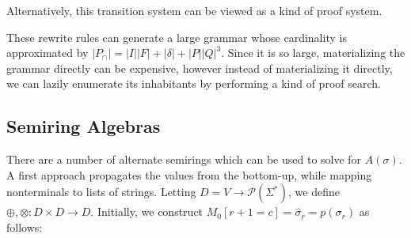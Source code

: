 \documentclass[runningheads]{llncs}
\begin{document}
\noindent Alternatively, this transition system can be viewed as a kind of proof system.


\noindent These rewrite rules can generate a large grammar whose cardinality is approximated by $|P_\cap|=|I||F| + |\delta| + |P||Q|^3$. Since it is so large, materializing the grammar directly can be expensive, however instead of materializing it directly, we can lazily enumerate its inhabitants by performing a kind of proof search.



\subsection{Semiring Algebras}

There are a number of alternate semirings which can be used to solve for $A(\sigma)$. A first approach propagates the values from the bottom-up, while mapping nonterminals to lists of strings. Letting $D = V \rightarrow \mathcal{P}(\Sigma^*)$, we define $\oplus, \otimes: D \times D \rightarrow D$. Initially, we construct $M_0[r+1=c] = \hat\sigma_r = p(\sigma_r)$ as follows:
\end{document}
